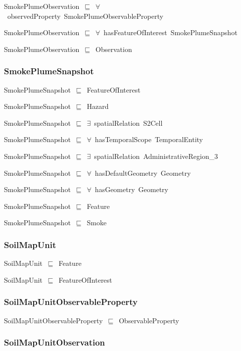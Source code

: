 \documentclass{article}
\begin{document}
SmokePlumeObservation~\ensuremath{\sqsubseteq}~\ensuremath{\forall}~observedProperty~SmokePlumeObservableProperty~

SmokePlumeObservation~\ensuremath{\sqsubseteq}~\ensuremath{\forall}~hasFeatureOfInterest~SmokePlumeSnapshot~

SmokePlumeObservation~\ensuremath{\sqsubseteq}~Observation~

\subsubsection*{SmokePlumeSnapshot}

SmokePlumeSnapshot~\ensuremath{\sqsubseteq}~FeatureOfInterest~

SmokePlumeSnapshot~\ensuremath{\sqsubseteq}~Hazard~

SmokePlumeSnapshot~\ensuremath{\sqsubseteq}~\ensuremath{\exists}~spatialRelation~S2Cell~

SmokePlumeSnapshot~\ensuremath{\sqsubseteq}~\ensuremath{\forall}~hasTemporalScope~TemporalEntity~

SmokePlumeSnapshot~\ensuremath{\sqsubseteq}~\ensuremath{\exists}~spatialRelation~AdministrativeRegion\_3~

SmokePlumeSnapshot~\ensuremath{\sqsubseteq}~\ensuremath{\forall}~hasDefaultGeometry~Geometry~

SmokePlumeSnapshot~\ensuremath{\sqsubseteq}~\ensuremath{\forall}~hasGeometry~Geometry~

SmokePlumeSnapshot~\ensuremath{\sqsubseteq}~Feature~

SmokePlumeSnapshot~\ensuremath{\sqsubseteq}~Smoke~

\subsubsection*{SoilMapUnit}

SoilMapUnit~\ensuremath{\sqsubseteq}~Feature~

SoilMapUnit~\ensuremath{\sqsubseteq}~FeatureOfInterest~

\subsubsection*{SoilMapUnitObservableProperty}

SoilMapUnitObservableProperty~\ensuremath{\sqsubseteq}~ObservableProperty~

\subsubsection*{SoilMapUnitObservation}
\end{document}
